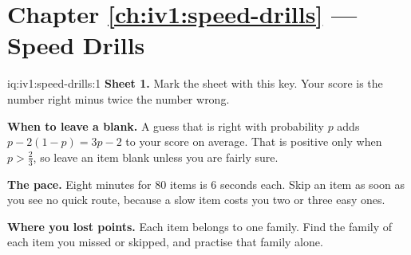 \section*{Chapter \ref{ch:iv1:speed-drills} --- Speed Drills}

\begin{solution}{iq:iv1:speed-drills:1}
\textbf{Sheet 1.} Mark the sheet with this key. Your score is the number right minus twice the number wrong.
\par\nopagebreak


\textbf{When to leave a blank.} A guess that is right with probability $p$ adds $p - 2(1 - p) = 3p - 2$ to your score on average. That is positive only when $p > \tfrac23$, so leave an item blank unless you are fairly sure.

\textbf{The pace.} Eight minutes for 80 items is 6 seconds each. Skip an item as soon as you see no quick route, because a slow item costs you two or three easy ones.

\textbf{Where you lost points.} Each item belongs to one family. Find the family of each item you missed or skipped, and practise that family alone.


\end{solution}

